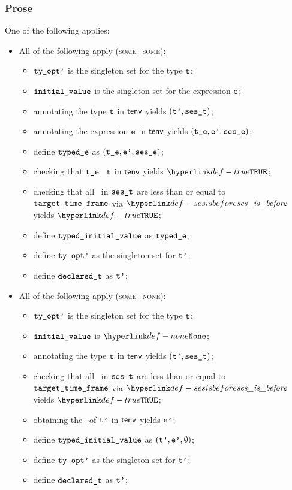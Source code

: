 \subsubsection{Prose}
One of the following applies:
\begin{itemize}
  \item All of the following apply (\textsc{some\_some}):
  \begin{itemize}
    \item $\texttt{ty\_opt'}$ is the singleton set for the type $\texttt{t}$;
    \item $\texttt{initial\_value}$ is the singleton set for the expression $\texttt{e}$;
    \item annotating the type $\texttt{t}$ in $\textsf{tenv}$ yields $(\texttt{t'}, \texttt{ses\_t})$\ProseOrTypeError;
    \item annotating the expression $\texttt{e}$ in $\textsf{tenv}$ yields $(\texttt{t\_e}, \texttt{e'}, \texttt{ses\_e})$\ProseOrTypeError;
    \item define $\texttt{typed\_e}$ as $(\texttt{t\_e}, \texttt{e'}, \texttt{ses\_e})$;
    \item checking that $\texttt{t\_e}$ \typesatisfies\ $\texttt{t}$ in $\textsf{tenv}$ yields $\True$\ProseOrTypeError;
    \item checking that all \timeframesterm\ in $\texttt{ses\_t}$ are less than or equal to \\
          $\texttt{target\_time\_frame}$ via $\sesisbefore$ yields $\True$\ProseOrTypeError;
    \item define $\texttt{typed\_initial\_value}$ as $\texttt{typed\_e}$;
    \item define $\texttt{ty\_opt'}$ as the singleton set for $\texttt{t'}$;
    \item define $\texttt{declared\_t}$ as $\texttt{t'}$;
  \end{itemize}

  \item All of the following apply (\textsc{some\_none}):
  \begin{itemize}
    \item $\texttt{ty\_opt'}$ is the singleton set for the type $\texttt{t}$;
    \item $\texttt{initial\_value}$ is $\None$;
    \item annotating the type $\texttt{t}$ in $\textsf{tenv}$ yields $(\texttt{t'}, \texttt{ses\_t})$\ProseOrTypeError;
    \item checking that all \timeframesterm\ in $\texttt{ses\_t}$ are less than or equal to \\
          $\texttt{target\_time\_frame}$ via $\sesisbefore$ yields $\True$\ProseOrTypeError;
    \item obtaining the \basevalueterm\ of $\texttt{t'}$ in $\textsf{tenv}$ yields $\texttt{e'}$\ProseOrTypeError;
    \item define $\texttt{typed\_initial\_value}$ as $(\texttt{t'}, \texttt{e'}, \emptyset)$;
    \item define $\texttt{ty\_opt'}$ as the singleton set for $\texttt{t'}$;
    \item define $\texttt{declared\_t}$ as $\texttt{t'}$;
  \end{itemize}


\end{itemize}
